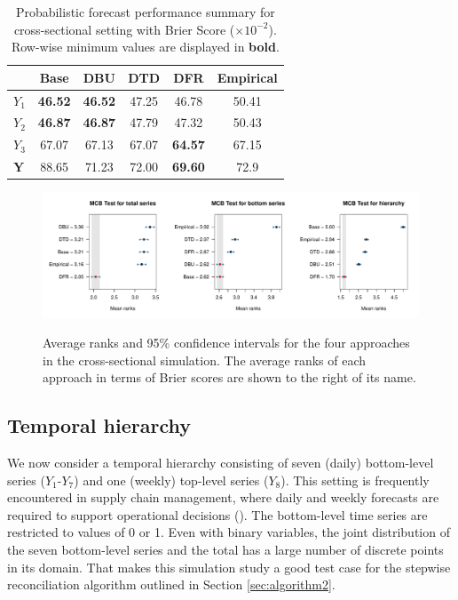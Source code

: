 \documentclass[a4paper,review,12pt,authoryear]{elsarticle}
\theoremstyle{definition}
\begin{document}
    \begin{table}
      \centering
      \caption{\label{tab:sim_crosssectional_res_dist} Probabilistic forecast performance summary for cross-sectional setting with Brier Score ($\times 10^{-2}$). Row-wise minimum values are displayed in \textbf{bold}.}
      \begin{tabular}{lccccc}
      \toprule
      ~ & Base & DBU & DTD & DFR & Empirical \\ \midrule
      $Y_1$ & \textbf{46.52} & \textbf{46.52} & 47.25 & 46.78 & 50.41 \\ 
      $Y_2$ & \textbf{46.87} & \textbf{46.87} & 47.79 & 47.32 & 50.43 \\ 
      $Y_3$ & 67.07 & 67.13 & 67.07 & \textbf{64.57} & 67.15 \\ 
      $\mathbf{Y}$ & 88.65 & 71.23 & 72.00 & \textbf{69.60} & 72.9 \\ 
      \bottomrule
      \end{tabular}
    \end{table}

    \begin{figure}
	\centering
	\caption{Average ranks and 95\% confidence intervals for the four approaches in the cross-sectional simulation. The average ranks of each approach in terms of Brier scores are shown to the right of its name.}
	\includegraphics[width=\textwidth]{figures/sim_cross_mcb.pdf}
    \label{fig:mcb_crosssectional} 
    \end{figure}


     \subsection{Temporal hierarchy}\label{sec:temporal_simu}
     We now consider a temporal hierarchy consisting of seven (daily) bottom-level series ($Y_1$-$Y_7$) and one (weekly) top-level series ($Y_8$).
     This setting is frequently encountered in supply chain management, where daily and weekly forecasts are required to support operational decisions (\citealp{syntetosSupplyChainForecasting2016}).
     The bottom-level time series are restricted to values of 0 or 1.
     Even with binary variables, the joint distribution of the seven bottom-level series and the total has a large number of discrete points in its domain. That makes this simulation study a good test case for the stepwise reconciliation algorithm outlined in Section \ref{sec:algorithm2}.
\end{document}
